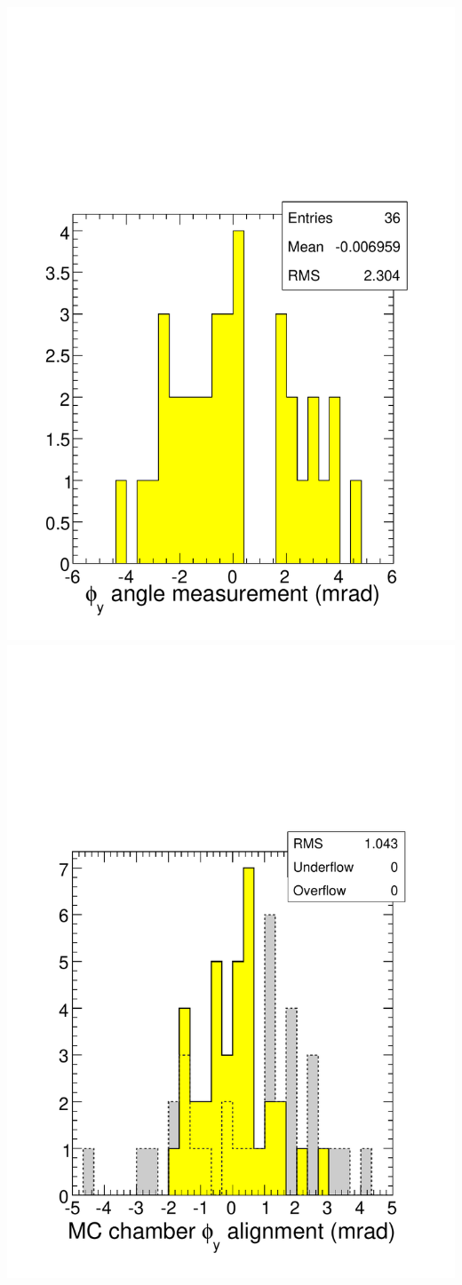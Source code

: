 \documentclass[compress]{beamer}
\begin{document}
\begin{frame}
\begin{columns}
\includegraphics[width=0.5\linewidth]{measured_phiy.pdf} \includegraphics[width=0.5\linewidth]{mcchamber_phiy.pdf}
\end{columns}
\end{frame}
\end{document}
